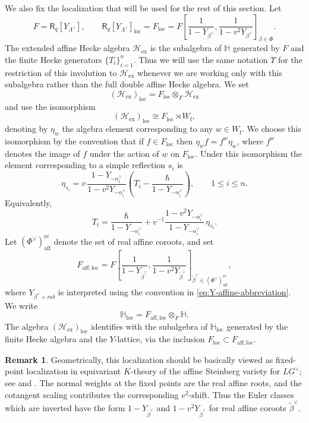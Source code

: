\documentclass{amsart}
\newcommand{\Ring}{\mathsf{R}}
\theoremstyle{definition}
\newtheorem{Rem}[Thm]{Remark}
\numberwithin{equation}{section}
\begin{document}
We also fix the localization that will be used for the rest of this section.
Let
\[
F=\Ring_q[Y_{\Lambda^\vee}],
\qquad
\Ring_q[Y_{\Lambda^\vee}]_{\mathrm{loc}}=F_{\mathrm{loc}}
=
F\left[
\frac{1}{1-Y_{\beta^\vee}},
\frac{1}{1-v^2Y_{\beta^\vee}}
\right]_{\beta\in\Phi}.
\]
The extended affine Hecke algebra $\mathcal H_{\mathrm{ex}}$ is the subalgebra of $\mathbb H$ generated by
$F$ and the finite Hecke generators $\{T_i\}_{i=1}^n$. Thus we will use the same notation $\Upsilon$ for the restriction of this involution to $\mathcal H_{\mathrm{ex}}$ whenever we are working only with this subalgebra rather than the full double affine Hecke algebra. We set
\[
(\mathcal H_{\mathrm{ex}})_{\mathrm{loc}}
=
F_{\mathrm{loc}}\otimes_F\mathcal H_{\mathrm{ex}}
\]
and use the isomorphism
\[
(\mathcal H_{\mathrm{ex}})_{\mathrm{loc}}\cong F_{\mathrm{loc}}\rtimes W_{\mathrm f},
\]
denoting by $\eta_w$ the algebra element corresponding to any $w\in W_{\mathrm f}$.
We choose this isomorphism by the convention that if $f\in F_{\mathrm{loc}}$ then
$\eta_w f=f^w\eta_w$, where \(f^w\) denotes the image of $f$ under the action of $w$ on $F_{\mathrm{loc}}$. Under this isomorphism the element corresponding to a
simple reflection $s_i$ is
\begin{equation}\label{eq:eta-simple-localization}
\eta_{s_i}
=
v\,\frac{1-Y_{-\alpha_i^\vee}}{1-v^2Y_{-\alpha_i^\vee}}
\left(T_i-\frac{\hbar}{1-Y_{-\alpha_i^\vee}}\right),
\qquad 1\leqslant i\leqslant n.
\end{equation}
Equivalently,
\begin{equation}\label{eq:localized-Ti}
T_i=\frac{\hbar}{1-Y_{-\alpha_i^\vee}}
    +v^{-1}\frac{1-v^2Y_{-\alpha_i^\vee}}{1-Y_{-\alpha_i^\vee}}\,\eta_{s_i}.
\end{equation}
Let \((\Phi^\vee)_{\mathrm{aff}}^{\mathrm{re}}\) denote the set of real affine coroots,
and set
\[
F_{\mathrm{aff,loc}}
=
F\left[
\frac{1}{1-Y_{\widetilde\beta^\vee}},
\frac{1}{1-v^2Y_{\widetilde\beta^\vee}}
\right]_{\widetilde\beta^\vee\in(\Phi^\vee)_{\mathrm{aff}}^{\mathrm{re}}},
\]
where \(Y_{\beta^\vee+m\delta}\) is interpreted using the convention in
\eqref{eq:Y-affine-abbreviation}. We write
\[
\mathbb H_{\mathrm{loc}}
=
F_{\mathrm{aff,loc}}\otimes_F\mathbb H.
\]
The algebra $(\mathcal H_{\mathrm{ex}})_{\mathrm{loc}}$ identifies with the
subalgebra of $\mathbb H_{\mathrm{loc}}$ generated by the finite Hecke algebra
and the $Y$-lattice, via the inclusion \(F_{\mathrm{loc}}\subset
F_{\mathrm{aff,loc}}\).

\begin{Rem}\label{rem:dolbeault-localization}
Geometrically, this localization should be {basically} viewed as fixed-point localization
in equivariant \(K\)-theory of the affine Steinberg variety for \(LG^\vee\);
see \cite[\S 5.11]{CG} and \cite[\S 3.2]{DMB}. The normal weights at the
fixed points are the real affine roots, and the cotangent scaling contributes
the corresponding \(v^2\)-shift. Thus the Euler classes which are inverted have
the form \(1-Y_{\widetilde\beta^\vee}\) and \(1-v^2Y_{\widetilde\beta^\vee}\) for real
affine coroots \(\widetilde\beta^\vee\).
\end{Rem}
\end{document}
